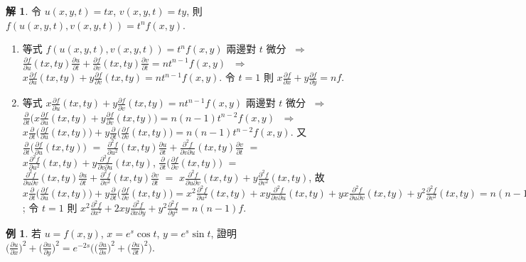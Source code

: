 \documentclass[12pt]{extarticle}
\newcommand{\ds}{\displaystyle}
\newcommand{\ie}{\;\Longrightarrow\;}
\theoremstyle{definition}
\newtheorem*{ex}{例}
\newtheorem*{sol}{解}
\newcommand{\pdiff}[2]{\frac{\partial #1}{\partial #2}}
\newcommand{\pdifft}[2]{\frac{\partial^2 #1}{\partial #2^2}}
\begin{document}
\begin{sol}
  令 $u(x, y, t) = tx$, $v(x, y, t) = ty$, 則 $\ds f(u(x, y, t), v(x, y, t)) = t^n f(x, y)$. 
  \begin{enumerate}\setlength{\itemsep}{0pt}
    \item 等式 $\ds f(u(x, y, t), v(x, y, t)) = t^n f(x, y)$ 兩邊對 $t$ 微分 $\ie$ $\ds\pdiff{f}{u}(tx, ty)\pdiff{u}{t} + \pdiff{f}{v}(tx, ty)\pdiff{v}{t} = n t^{n - 1}f(x, y)$ $\ie$ $\ds x\pdiff{f}{u}(tx, ty) + y\pdiff{f}{v}(tx, ty) = n t^{n - 1}f(x, y)$. 令 $t = 1$ 則 $\ds x\pdiff{f}{x} + y\pdiff{f}{y} = nf$.
    \item 等式 $\ds x\pdiff{f}{u}(tx, ty) + y\pdiff{f}{v}(tx, ty) = n t^{n - 1}f(x, y)$ 兩邊對 $t$ 微分 $\ie$ $\ds\pdiff{}{t}\bigg(x\pdiff{f}{u}(tx, ty) + y\pdiff{f}{v}(tx, ty)\bigg) = n(n - 1) t^{n - 2}f(x, y)$ $\ie$ $\ds x\pdiff{}{t}\bigg(\pdiff{f}{u}(tx, ty)\bigg) + y\pdiff{}{t}\bigg(\pdiff{f}{v}(tx, ty)\bigg) = n(n - 1) t^{n - 2}f(x, y)$. 又 $\ds\pdiff{}{t}\bigg(\pdiff{f}{u}(tx, ty)\bigg)$ $=$ $\ds\pdifft{f}{u}(tx, ty)\pdiff{u}{t} + \frac{\partial^2 f}{\partial v\partial u}(tx, ty)\pdiff{v}{t}$ $=$ $\ds x\pdifft{f}{u}(tx, ty) + y\frac{\partial^2 f}{\partial v\partial u}(tx, ty)$, $\ds\pdiff{}{t}\bigg(\pdiff{f}{v}(tx, ty)\bigg)$ $=$ $\ds\frac{\partial^2 f}{\partial u\partial v}(tx, ty)\pdiff{u}{t} + \pdifft{f}{v}(tx, ty)\pdiff{v}{t}$ $=$ $\ds x\frac{\partial^2 f}{\partial u\partial v}(tx, ty) + y\pdifft{f}{v}(tx, ty)$, 故 $\ds x\pdiff{}{t}\bigg(\pdiff{f}{u}(tx, ty)\bigg) + y\pdiff{}{t}\bigg(\pdiff{f}{v}(tx, ty)\bigg) = x^2\pdifft{f}{u}(tx, ty) + xy\frac{\partial^2 f}{\partial v\partial u}(tx, ty) + yx\frac{\partial^2 f}{\partial u\partial v}(tx, ty) + y^2\pdifft{f}{v}(tx, ty) = n(n - 1) t^{n - 2}f(x, y)$; 令 $t = 1$ 則 $\ds x^2\pdifft{f}{x} + 2xy\frac{\partial^2 f}{\partial x\partial y} + y^2\pdifft{f}{y} = n(n - 1)f$.
  \end{enumerate}
\end{sol}

\begin{ex}
  若 $\ds u = f(x, y)$, $\ds x = e^s\cos t$, $\ds y = e^s\sin t$, 證明 $\ds\bigg(\pdiff{u}{x}\bigg)^2 + \bigg(\pdiff{u}{y}\bigg)^2 = e^{-2s}\bigg(\bigg(\pdiff{u}{s}\bigg)^2 + \bigg(\pdiff{u}{t}\bigg)^2\bigg)$.   
\end{ex}
\end{document}
